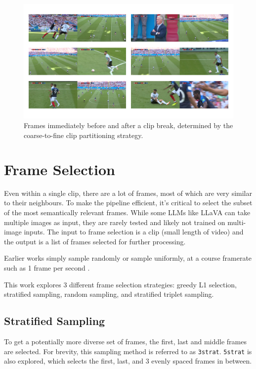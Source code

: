 \begin{figure}
      \centering
      \includegraphics[width=\textwidth]{figures/breaks.png}
      \caption{Frames immediately before and after a clip break, determined by the coarse-to-fine clip partitioning strategy.}
      \label{fig:breaks}
\end{figure}


\section{Frame Selection}

Even within a single clip, there are a lot of frames, most of which are very similar to their neighbours.
To make the pipeline efficient, it's critical to select the subset of the most semantically relevant frames.
While some LLMs like LLaVA can take multiple images as input, they are rarely tested and likely not trained on multi-image inputs.
The input to frame selection is a clip (small length of video) and the output is a list of frames selected for further processing.

Earlier works simply sample randomly \cite{clipbert} or sample uniformly, at a course framerate such as 1 frame per second \cite{clip4clip}.

This work explores 3 different frame selection strategies:
greedy L1 selection, stratified sampling, random sampling, and stratified triplet sampling.

\subsection{Stratified Sampling}
To get a potentially more diverse set of frames, the first, last and middle frames are selected.
For brevity, this sampling method is referred to as \verb|3strat|. \verb|5strat| is also explored, which selects the first, last, and 3 evenly spaced frames in between.


